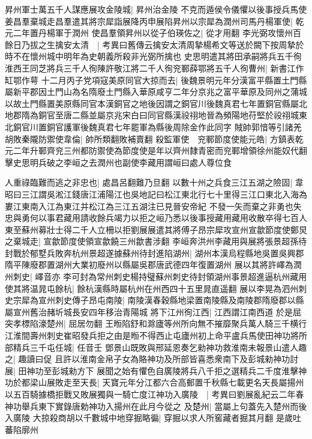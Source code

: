 昇州軍士萬五千人謀應展攻金陵城|{
	昇州治金陵}
不克而遁侯令儀懼以後事授兵馬使姜昌羣棄城走昌羣遣其將宗犀詣展降丙申展陷昇州以宗犀為潤州司馬丹楊軍使|{
	乾元二年置丹楊軍于潤州}
使昌羣領昇州以從子伯瑛佐之|{
	從才用翻}
李光弼攻懷州百餘日乃拔之生擒安太清　|{
	考異曰舊傳云擒安太清周摯楊希文等送於闕下按周摯於時不在懷州城中明年為史朝義所殺非光弼所擒也}
史思明遣其將田承嗣將兵五千徇淮西王同芝將兵三千人徇陳許敬江將二千人徇兖鄆薛鄂將五千人徇曹州|{
	新書江作缸鄂作萼}
十二月丙子党項寇美原同官大掠而去|{
	後魏景明元年分漢富平縣置土門縣屬新平郡因土門山為名隋廢土門縣入華原咸亨二年分京兆之富平華原及同州之蒲城以故土門縣置美原縣同官本漢銅官之地後因謂之銅官川後魏真君七年置銅官縣屬北地郡隋為銅官至唐二縣並屬京兆宋白曰同官縣漢祋祤地晉為頻陽地苻堅於祋祤城東北銅官川置銅官護軍後魏真君七年罷軍為縣後周除金作此同字}
賊帥郭愔等引諸羌胡敗秦隴防禦使韋倫|{
	帥所類翻敗補賣翻}
殺監軍使　兖鄆節度使能元皓|{
	方鎮表乾元二年升鄆齊兖三州都防禦使為節度使是年以齊州隸青密而兖鄆增領徐州能奴代翻}
擊史思明兵破之李峘之去潤州也副使李藏用謂峘曰處人尊位食

人重祿臨難而逃之非忠也|{
	處昌呂翻難乃旦翻}
以數十州之兵食三江五湖之險固|{
	韋昭曰三江謂吳淞江錢唐江浦陽江也吳地記曰松江東北行七十里得三江口東北入海為婁江東南入江為東江并松江為三江五湖注已見晉安帝紀}
不發一矢而棄之非勇也失忠與勇何以事君藏用請收餘兵竭力以拒之峘乃悉以後事授藏用藏用收散卒得七百人東至蘇州募壯士得二千人立柵以拒劉展展遣其將傅子昂宗犀攻宣州宣歙節度使鄭炅之棄城走|{
	宣歙節度使領宣歙饒三州歙書涉翻}
李峘奔洪州李藏用與展將張景超孫待封戰於郁墅兵敗奔杭州景超遂據蘇州待封進陷湖州|{
	湖州本漢烏程縣地吳置吳興郡隋平陳廢郡置湖州大業初廢州以縣屬吳郡唐武德四年復置湖州}
展以其將許嶧為潤州刺史|{
	嶧音亦}
李可封為常州刺史楊持璧蘇州刺史待封領湖州事景超進逼杭州藏用使其將温晁屯餘杭|{
	餘杭漢縣時屬杭州在州西四十五里晁直遥翻}
展以李晃為泗州刺史宗犀為宣州刺史傳子昂屯南陵|{
	南陵漢春穀縣地梁置南陵縣及南陵郡隋廢郡以縣屬宣州舊治赭圻城長安四年移治青陽城}
將下江州徇江西|{
	江西謂江南西道}
於是屈突孝標陷濠楚州|{
	屈居勿翻}
王暅陷舒和滁廬等州所向無不摧靡聚兵萬人騎三千横行江淮間壽州刺史崔昭發兵拒之由是暅不得西止屯廬州初上命平盧兵馬使田神功將所部精兵三千屯任城|{
	任音壬}
鄧景山既敗與邢延恩奏乞勑神功救淮南未報景山遣人趣之|{
	趣讀曰促}
且許以淮南金帛子女為賂神功及所部皆喜悉衆南下及彭城勑神功討展|{
	田神功至彭城勑方下}
展聞之始有懼色自廣陵將兵八千拒之選精兵二千度淮擊神功於都梁山展敗走至天長|{
	天寶元年分江都六合高郵置千秋縣七載更名天長屬揚州}
以五百騎據橋拒戰又敗展獨與一騎亡度江神功入廣陵　|{
	考異曰劉展亂紀云二年春神功舉兵東下實錄唐勅神功入揚州在此月今從之}
及楚州|{
	當屬上句蓋先入楚州而後入廣陵}
大掠殺商胡以千數城中地穿掘略徧|{
	穿掘以求人所窖藏者掘其月翻}
是歲吐蕃陷廓州

